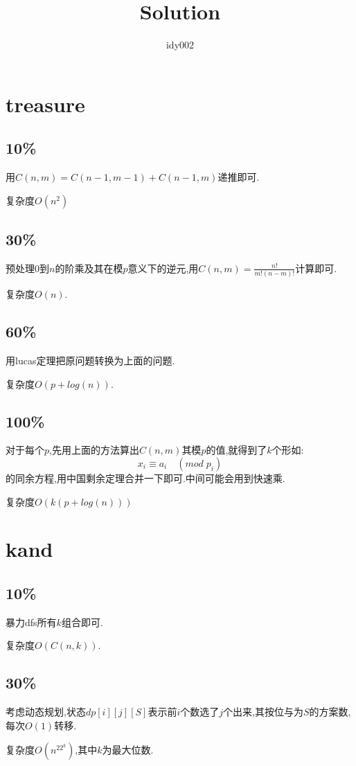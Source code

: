 \documentclass[10pt,a4paper,twoside]{article}
\author{idy002}
\title{Solution}
\begin{document}
	\maketitle
	
	\newpage
	\section{treasure}
		\subsection{10\%}
			用$C(n,m) = C(n-1,m-1) + C(n-1,m)$递推即可.
			
			复杂度$O(n^2)$
		\subsection{30\%}
			预处理$0$到$n$的阶乘及其在模$p$意义下的逆元,用$C(n,m) = \frac{n!}{m!(n-m)!}$计算即可.
			
			复杂度$O(n)$.
		\subsection{60\%}
			用lucas定理把原问题转换为上面的问题.
			
			复杂度$O(p + log(n))$.
		\subsection{100\%}
			对于每个$p$,先用上面的方法算出$C(n,m)$其模$p$的值,就得到了$k$个形如:
			$$
				x_i \equiv a_i \quad ( mod \; p_i )
			$$
			的同余方程,用中国剩余定理合并一下即可.中间可能会用到快速乘.
			
			复杂度$O(k(p + log(n)))$
		\newpage
	\section{kand}
			\subsection{10\%}
				暴力dfs所有$k$组合即可.
				
				复杂度$O(C(n,k))$.
			\subsection{30\%}
				考虑动态规划,状态$dp[i][j][S]$表示前$i$个数选了$j$个出来,其按位与为$S$的方案数,每次$O(1)$转移.
				
				复杂度$O(n^22^k)$,其中$k$为最大位数.
\end{document}

